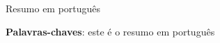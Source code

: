 \setlength{\absparsep}{18pt} %
\begin{resumo}
Resumo em português

 \textbf{Palavras-chaves}: este é o resumo em português
\end{resumo}